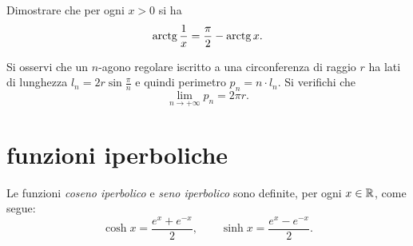 \begin{exercise}
Dimostrare che per ogni $x>0$ si ha
\[
  \operatorname{arctg} \frac 1 x = \frac \pi 2 - \operatorname{arctg} x.
\]
\end{exercise}

\begin{exercise}
Si osservi che un $n$-agono regolare iscritto a una circonferenza 
di raggio $r$ ha lati di lunghezza $l_n = 2r\sin \frac{\pi}{n}$
e quindi perimetro $p_n = n\cdot l_n$.
Si verifichi che 
\[
  \lim_{n\to +\infty} p_n = 2\pi r.
\]
\end{exercise}

\section{funzioni iperboliche}

\begin{definition}
Le funzioni
\emph{coseno iperbolico} e \emph{seno iperbolico}
sono definite, per ogni $x\in {\mathbb R}$,
come segue:
\mymargin{$\sinh$, $\cosh$}%
\index{$\sinh$, $\cosh$}%
%
%
%
\index{$\sinh$}%
\index{$\cosh$}%
\begin{equation}
\label{eq:sinh_cosh}
  \cosh x = \frac{e^x + e^{-x}}{2},
  \qquad
  \sinh x = \frac{e^x - e^{-x}}{2}.
\end{equation}
\end{definition}

